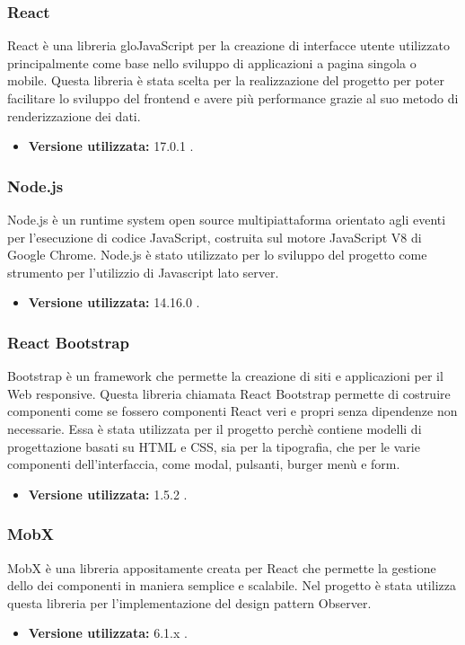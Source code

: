 \subsubsection{React}
React è una libreria glo{JavaScript} per la creazione di interfacce utente utilizzato principalmente come base nello sviluppo di applicazioni a pagina singola o mobile.
Questa libreria è stata scelta per la realizzazione del progetto per poter facilitare lo sviluppo del frontend e avere più performance grazie al suo metodo di renderizzazione dei dati.
\begin{itemize}
\item \textbf{Versione utilizzata:} 17.0.1 .
\end{itemize}
\subsubsection{Node.js}
Node.js è un runtime system open source multipiattaforma orientato agli eventi per l'esecuzione di codice JavaScript, costruita sul motore JavaScript V8 di Google Chrome.
Node.js è stato utilizzato per lo sviluppo del progetto \NomeProgetto{} come strumento per l'utilizzio di Javascript lato server.
\begin{itemize}
\item \textbf{Versione utilizzata:} 14.16.0 .
\end{itemize}
\subsubsection{React Bootstrap}
Bootstrap è un framework che permette la creazione di siti e applicazioni per il Web responsive. Questa libreria chiamata React Bootstrap permette di costruire componenti come se fossero componenti React veri e propri senza dipendenze non necessarie. Essa è stata utilizzata per il progetto perchè contiene modelli di progettazione basati su HTML e CSS, sia per la tipografia, che per le varie componenti dell'interfaccia, come modal, pulsanti, burger menù e form.
\begin{itemize}
\item \textbf{Versione utilizzata:} 1.5.2 .
\end{itemize}
\subsubsection{MobX}
MobX è una libreria appositamente creata per React che permette la gestione dello  dei componenti in maniera semplice e scalabile. Nel progetto \NomeProgetto{} è stata utilizza questa libreria per l'implementazione del design pattern Observer.
\begin{itemize}
\item \textbf{Versione utilizzata:} 6.1.x .
\end{itemize}
